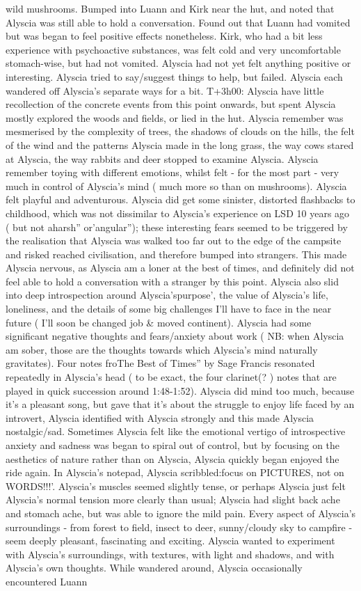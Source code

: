 \documentclass[12pt]{book}
\begin{document}
wild mushrooms. Bumped into Luann and Kirk near the hut, and noted that Alyscia was still able to hold a conversation. Found out that Luann had vomited but was began to feel positive effects nonetheless. Kirk, who had a bit less experience with psychoactive substances, was felt cold and very uncomfortable stomach-wise, but had not vomited. Alyscia had not yet felt anything positive or interesting. Alyscia tried to say/suggest things to help, but failed. Alyscia each wandered off Alyscia's separate ways for a bit. T+3h00: Alyscia have little recollection of the concrete events from this point onwards, but spent Alyscia mostly explored the woods and fields, or lied in the hut. Alyscia remember was mesmerised by the complexity of trees, the shadows of clouds on the hills, the felt of the wind and the patterns Alyscia made in the long grass, the way cows stared at Alyscia, the way rabbits and deer stopped to examine Alyscia. Alyscia remember toying with different emotions, whilst felt - for the most part - very much in control of Alyscia's mind ( much more so than on mushrooms). Alyscia felt playful and adventurous. Alyscia did get some sinister, distorted flashbacks to childhood, which was not dissimilar to Alyscia's experience on LSD 10 years ago ( but not aharsh'' or'angular''); these interesting fears seemed to be triggered by the realisation that Alyscia was walked too far out to the edge of the campsite and risked reached civilisation, and therefore bumped into strangers. This made Alyscia nervous, as Alyscia am a loner at the best of times, and definitely did not feel able to hold a conversation with a stranger by this point. Alyscia also slid into deep introspection around Alyscia'spurpose', the value of Alyscia's life, loneliness, and the details of some big challenges I'll have to face in the near future ( I'll soon be changed job \& moved continent). Alyscia had some significant negative thoughts and fears/anxiety about work ( NB: when Alyscia am sober, those are the thoughts towards which Alyscia's mind naturally gravitates). Four notes froThe Best of Times'' by Sage Francis resonated repeatedly in Alyscia's head ( to be exact, the four clarinet(? ) notes that are played in quick succession around 1:48-1:52). Alyscia did mind too much, because it's a pleasant song, but gave that it's about the struggle to enjoy life faced by an introvert, Alyscia identified with Alyscia strongly and this made Alyscia nostalgic/sad. Sometimes Alyscia felt like the emotional vertigo of introspective anxiety and sadness was began to spiral out of control, but by focusing on the aesthetics of nature rather than on Alyscia, Alyscia quickly began enjoyed the ride again. In Alyscia's notepad, Alyscia scribbled:focus on PICTURES, not on WORDS!!!'. Alyscia's muscles seemed slightly tense, or perhaps Alyscia just felt Alyscia's normal tension more clearly than usual; Alyscia had slight back ache and stomach ache, but was able to ignore the mild pain. Every aspect of Alyscia's surroundings - from forest to field, insect to deer, sunny/cloudy sky to campfire - seem deeply pleasant, fascinating and exciting. Alyscia wanted to experiment with Alyscia's surroundings, with textures, with light and shadows, and with Alyscia's own thoughts. While wandered around, Alyscia occasionally encountered Luann 
\end{document}

